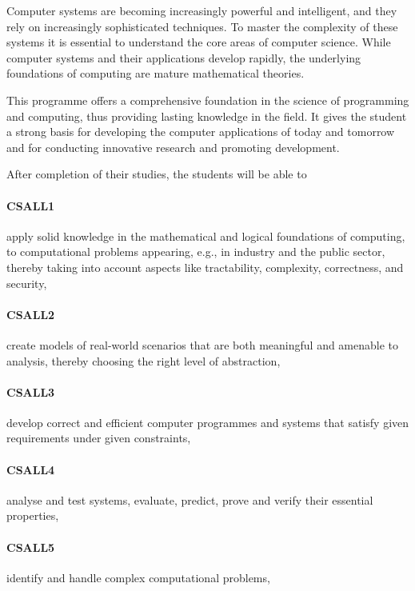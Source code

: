 
Computer systems are becoming increasingly powerful and intelligent,
and they rely on increasingly sophisticated techniques. To master the
complexity of these systems it is essential to understand the core
areas of computer science. While computer systems and their
applications develop rapidly, the underlying foundations of computing
are mature mathematical theories.

This programme offers a comprehensive foundation in the science of
programming and computing, thus providing lasting knowledge in the
field. It gives the student a strong basis for developing the computer
applications of today and tomorrow and for conducting innovative
research and promoting development.

After completion of their studies, the students will be able to

\paragraph{CSALL1} apply solid knowledge in the mathematical and logical
  foundations of computing, to computational problems appearing, e.g.,
  in industry and the public sector, thereby taking into account
  aspects like tractability, complexity, correctness, and security,
\paragraph{CSALL2} create models of real-world scenarios that are both meaningful
  and amenable to analysis, thereby choosing the right level of
  abstraction,
\paragraph{CSALL3} develop correct and efficient computer programmes and systems
  that satisfy given requirements under given constraints,
\paragraph{CSALL4} analyse and test systems, evaluate, predict, prove and verify
  their essential properties,
\paragraph{CSALL5} identify and handle complex computational problems,
